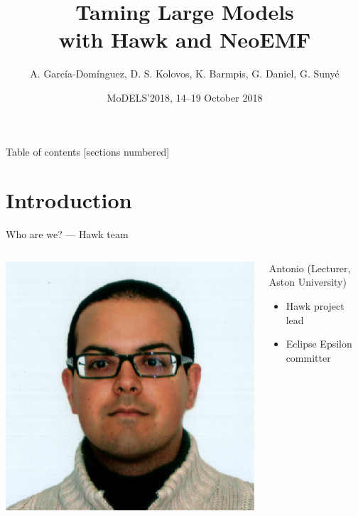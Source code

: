 \documentclass[10pt]{beamer}
\title{Taming Large Models\\with Hawk and NeoEMF}
\date{MoDELS'2018, 14--19 October 2018}
\author{A. García-Domínguez, D. S. Kolovos, K. Barmpis, G. Daniel, G. Sunyé}
\begin{document}
\maketitle

\begin{frame}{Table of contents}
  [sections numbered]
  \tableofcontents[hideallsubsections]
\end{frame}

\section{Introduction}

\begin{frame}{Who are we? --- Hawk team}
\centering

\begin{columns}
\centering
\includegraphics[height=.25\textheight]{biopic-01-antonio}
\begin{block}{Antonio (Lecturer, Aston University)}
\begin{itemize}
\item Hawk project lead
\item Eclipse Epsilon committer
\end{itemize}
\end{block}
\end{columns}


\end{frame}
\end{document}

